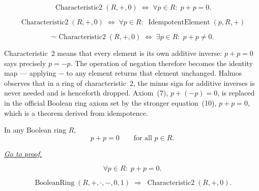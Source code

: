\begin{remark*}
\[
\operatorname{Characteristic2}(R,+,0)
\;\Longleftrightarrow\;
\forall p \in R{:}\; p + p = 0.
\]
\end{remark*}

\begin{remark*}
\[
\operatorname{Characteristic2}(R,+,0)
\;\Longleftrightarrow\;
\forall p \in R{:}\;
\operatorname{IdempotentElement}(p, R, +)
\]
\end{remark*}

\begin{remark*}
\[
\neg\,\operatorname{Characteristic2}(R,+,0)
\;\Longleftrightarrow\;
\exists p \in R{:}\; p + p \neq 0.
\]
\end{remark*}

\begin{remark*}[Interpretation]
Characteristic~2 means that every element is its own additive
inverse: $p + p = 0$ says precisely $p = -p$.  The operation of
negation therefore becomes the identity map --- applying $-$ to
any element returns that element unchanged.  Halmos observes that
in a ring of characteristic~2, the minus sign for additive inverses
is never needed and is henceforth dropped.  Axiom~(7),
$p + (-p) = 0$, is replaced in the official Boolean ring axiom set
by the stronger equation~(10), $p + p = 0$, which is a theorem
derived from idempotence.
\end{remark*}


\begin{lemma}
\label{lem:self-additive-inverse}
In any Boolean ring $R$,
\[
p + p = 0 \qquad \text{for all } p \in R.
\]

\smallskip
\noindent
\hyperref[prf:boolean-ring-self-additive-inverse]{\textit{Go to proof.}}
\end{lemma}

\begin{remark*}
\[
\forall p \in R{:}\; p + p = 0.
\]
\end{remark*}

\begin{remark*}
\[
\operatorname{BooleanRing}(R,+,\cdot,-,0,1)
\;\Longrightarrow\;
\operatorname{Characteristic2}(R,+,0).
\]
\end{remark*}

